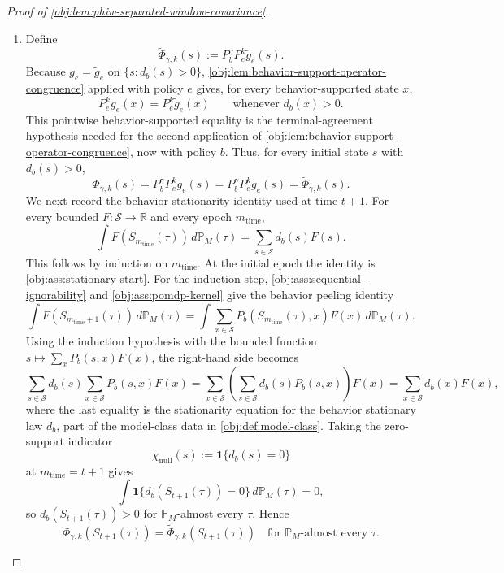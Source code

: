 \documentclass[11pt]{article}
\begin{document}
\begin{proof}[Proof of \cref{obj:lem:phiw-separated-window-covariance}]
\begin{enumerate}
\item Define
\[
\widetilde\Phi_{\gamma,k}(s):=P_b^\gamma P_e^k\widetilde g_e(s).
\]
Because \(g_e=\widetilde g_e\) on \(\{s:d_b(s)>0\}\), \cref{obj:lem:behavior-support-operator-congruence} applied with policy \(e\) gives, for every behavior-supported state \(x\),
\[
P_e^k g_e(x)=P_e^k\widetilde g_e(x)
\qquad\text{whenever }d_b(x)>0.
\]
This pointwise behavior-supported equality is the terminal-agreement hypothesis needed for the second application of \cref{obj:lem:behavior-support-operator-congruence}, now with policy \(b\). Thus, for every initial state \(s\) with \(d_b(s)>0\),
\[
\Phi_{\gamma,k}(s)=P_b^\gamma P_e^k g_e(s)
=P_b^\gamma P_e^k\widetilde g_e(s)
=\widetilde\Phi_{\gamma,k}(s).
\]
We next record the behavior-stationarity identity used at time \(t+1\). For every bounded \(F:\mathcal S\to\mathbb R\) and every epoch \(m_{\mathrm{time}}\),
\[
\int F(S_{m_{\mathrm{time}}}(\tau))\,d\mathbb P_M(\tau)
=
\sum_{s\in\mathcal S}d_b(s)F(s).
\]
This follows by induction on \(m_{\mathrm{time}}\). At the initial epoch the identity is \cref{obj:ass:stationary-start}. For the induction step, \cref{obj:ass:sequential-ignorability} and \cref{obj:ass:pomdp-kernel} give the behavior peeling identity
\[
\int F(S_{m_{\mathrm{time}}+1}(\tau))\,d\mathbb P_M(\tau)
=
\int \sum_{x\in\mathcal S}P_b(S_{m_{\mathrm{time}}}(\tau),x)F(x)\,d\mathbb P_M(\tau).
\]
Using the induction hypothesis with the bounded function \(s\mapsto \sum_x P_b(s,x)F(x)\), the right-hand side becomes
\[
\sum_{s\in\mathcal S}d_b(s)\sum_{x\in\mathcal S}P_b(s,x)F(x)
=
\sum_{x\in\mathcal S}\left(\sum_{s\in\mathcal S}d_b(s)P_b(s,x)\right)F(x)
=
\sum_{x\in\mathcal S}d_b(x)F(x),
\]
where the last equality is the stationarity equation for the behavior stationary law \(d_b\), part of the model-class data in \cref{obj:def:model-class}. Taking the zero-support indicator
\[
\chi_{\mathrm{null}}(s):=\mathbf 1\{d_b(s)=0\}
\]
at \(m_{\mathrm{time}}=t+1\) gives
\[
\int \mathbf 1\{d_b(S_{t+1}(\tau))=0\}\,d\mathbb P_M(\tau)=0,
\]
so \(d_b(S_{t+1}(\tau))>0\) for \(\mathbb P_M\)-almost every \(\tau\). Hence
\[
\Phi_{\gamma,k}(S_{t+1}(\tau))
=
\widetilde\Phi_{\gamma,k}(S_{t+1}(\tau))
\quad\text{for }\mathbb P_M\text{-almost every }\tau .
\] %


\end{enumerate}
\end{proof}
\end{document}
